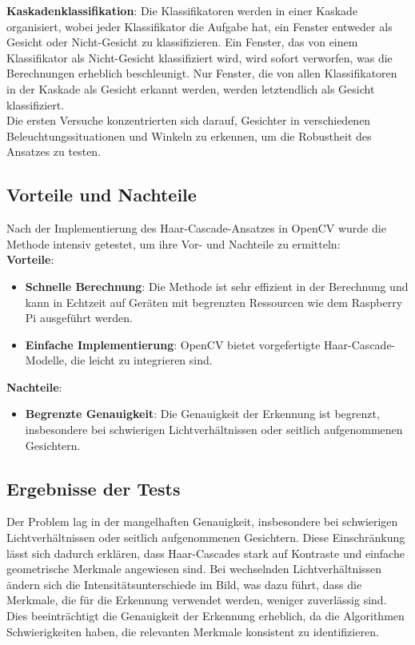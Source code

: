 \noindent \textbf{Kaskadenklassifikation}: Die Klassifikatoren werden in einer Kaskade organisiert, wobei jeder Klassifikator die Aufgabe hat, ein Fenster entweder als Gesicht oder Nicht-Gesicht zu klassifizieren. Ein Fenster, das von einem Klassifikator als Nicht-Gesicht klassifiziert wird, wird sofort verworfen, was die Berechnungen erheblich beschleunigt. Nur Fenster, die von allen Klassifikatoren in der Kaskade als Gesicht erkannt werden, werden letztendlich als Gesicht klassifiziert.\\

\noindent Die ersten Versuche konzentrierten sich darauf, Gesichter in verschiedenen Beleuchtungssituationen und Winkeln zu erkennen, um die Robustheit des Ansatzes zu testen.


\subsection{Vorteile und Nachteile}
Nach der Implementierung des Haar-Cascade-Ansatzes in OpenCV wurde die Methode intensiv getestet, um ihre Vor- und Nachteile zu ermitteln: \\

\noindent \textbf{Vorteile}:
\begin{itemize}
    \item \textbf{Schnelle Berechnung}: Die Methode ist sehr effizient in der Berechnung und kann in Echtzeit auf Geräten mit begrenzten Ressourcen wie dem Raspberry Pi ausgeführt werden.
    \item \textbf{Einfache Implementierung}: OpenCV bietet vorgefertigte Haar-Cascade-Modelle, die leicht zu integrieren sind.
\end{itemize}

\noindent \textbf{Nachteile}:
\begin{itemize}
    \item \textbf{Begrenzte Genauigkeit}: Die Genauigkeit der Erkennung ist begrenzt, insbesondere bei schwierigen Lichtverhältnissen oder seitlich aufgenommenen Gesichtern.
\end{itemize}

\subsection{Ergebnisse der Tests}

 Der Problem lag in der mangelhaften Genauigkeit, insbesondere bei schwierigen Lichtverhältnissen oder seitlich aufgenommenen Gesichtern. Diese Einschränkung lässt sich dadurch erklären, dass Haar-Cascades stark auf Kontraste und einfache geometrische Merkmale angewiesen sind. Bei wechselnden Lichtverhältnissen ändern sich die Intensitätsunterschiede im Bild, was dazu führt, dass die Merkmale, die für die Erkennung verwendet werden, weniger zuverlässig sind. Dies beeinträchtigt die Genauigkeit der Erkennung erheblich, da die Algorithmen Schwierigkeiten haben, die relevanten Merkmale konsistent zu identifizieren.

